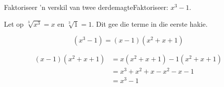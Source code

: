\begin{wex}{Faktoriseer 'n verskil van twee derdemagte}{Faktoriseer: $x^{3} - 1$.}
{
Let op $\sqrt[3]{x^{3}} = x$ en $\sqrt[3]{1} = 1$. Dit gee die terme in die eerste hakie.

\begin{equation*}
  (x^{3} - 1) = (x-1)(x^{2}+x+1)
\end{equation*}

\begin{align*}
  (x-1)(x^{2}+x+1) &= x(x^{2}+x+1)-1(x^{2}+x+1)\\
		   &=x^{3}+x^{2}+x-x^{2}-x-1\\
		   &=x^{3}-1\\
\end{align*}
}
\end{wex}

% 
% 

